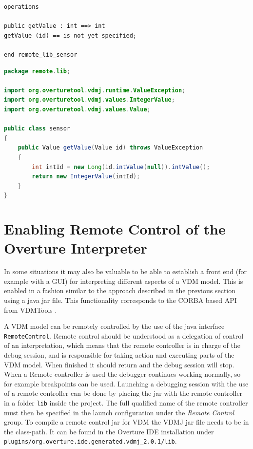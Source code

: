 \documentclass{overturerep}
\begin{document}
{\begin{lstlisting}[language=VDM++,label=remoteSensorVdm,caption=Remote sensor VDM class,captionpos=b]
operations

public getValue : int ==> int
getValue (id) == is not yet specified;

end remote_lib_sensor
\end{lstlisting}


\begin{lstlisting}[language=JAVA,label=remoteSensorJava,caption=Remote sensor Java class,captionpos=b]
package remote.lib;

import org.overturetool.vdmj.runtime.ValueException;
import org.overturetool.vdmj.values.IntegerValue;
import org.overturetool.vdmj.values.Value;

public class sensor
{
	public Value getValue(Value id) throws ValueException
	{
		int intId = new Long(id.intValue(null)).intValue();
		return new IntegerValue(intId);
	}
}
\end{lstlisting}

\section{Enabling Remote Control of the Overture
  Interpreter}\label{sec:remote}

In some situations it may also be valuable to be able to establish a
front end (for example with a GUI) for interpreting different aspects
of a VDM model. This is enabled in a fashion similar to the approach described in the 
previous section using a java jar file. This functionality corresponds
to the CORBA based API from VDMTools \cite{APIMan}.

A VDM model can be remotely controlled by the use of the java interface
\texttt{RemoteControl}. Remote control should be understood as a
delegation of control of an interpretation, which means that the remote
controller is in charge of the debug session, and is responsible for taking
action and executing parts of the VDM model. When finished it should
return and the debug session will stop. When a Remote controller is
used the debugger continues working normally, so for example breakpoints can be
used. Launching a debugging session with the use of a remote
controller can be done by placing the jar with the remote controller
in a folder \texttt{lib} inside the project. The full
qualified name of the remote controller must then be specified in the launch configuration
under the \textit{Remote Control} group.  To compile a remote control
jar for VDM the VDMJ jar file needs to be in the class-path. It can be found
in the Overture IDE installation
under\\ \texttt{plugins/org.overture.ide.generated.vdmj\_2.0.1/lib}.

}
\end{document}
